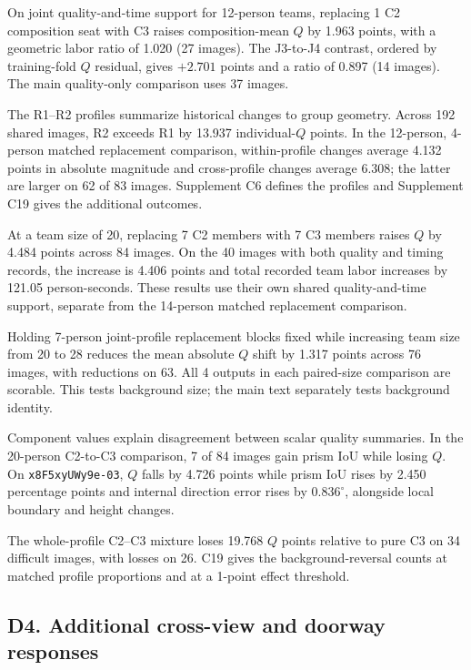 On joint quality-and-time support for 12-person teams, replacing 1 C2 composition seat with C3 raises composition-mean $Q$ by 1.963 points, with a geometric labor ratio of 1.020 (27 images). The J3-to-J4 contrast, ordered by training-fold $Q$ residual, gives $+2.701$ points and a ratio of 0.897 (14 images). The main quality-only comparison uses 37 images.

The R1--R2 profiles summarize historical changes to group geometry. Across 192 shared images, R2 exceeds R1 by 13.937 individual-$Q$ points. In the 12-person, 4-person matched replacement comparison, within-profile changes average 4.132 points in absolute magnitude and cross-profile changes average 6.308; the latter are larger on 62 of 83 images. Supplement C6 defines the profiles and Supplement C19 gives the additional outcomes.

At a team size of 20, replacing 7 C2 members with 7 C3 members raises $Q$ by 4.484 points across 84 images. On the 40 images with both quality and timing records, the increase is 4.406 points and total recorded team labor increases by 121.05 person-seconds. These results use their own shared quality-and-time support, separate from the 14-person matched replacement comparison.

Holding 7-person joint-profile replacement blocks fixed while increasing team size from 20 to 28 reduces the mean absolute $Q$ shift by 1.317 points across 76 images, with reductions on 63. All 4 outputs in each paired-size comparison are scorable. This tests background size; the main text separately tests background identity.

Component values explain disagreement between scalar quality summaries. In the 20-person C2-to-C3 comparison, 7 of 84 images gain prism IoU while losing $Q$. On \texttt{x8F5xyUWy9e-03}, $Q$ falls by 4.726 points while prism IoU rises by 2.450 percentage points and internal direction error rises by $0.836^\circ$, alongside local boundary and height changes.

The whole-profile C2--C3 mixture loses 19.768 $Q$ points relative to pure C3 on 34 difficult images, with losses on 26. C19 gives the background-reversal counts at matched profile proportions and at a 1-point effect threshold.

\subsection*{D4. Additional cross-view and doorway responses}
\label{supp:d4-viewpoint}

